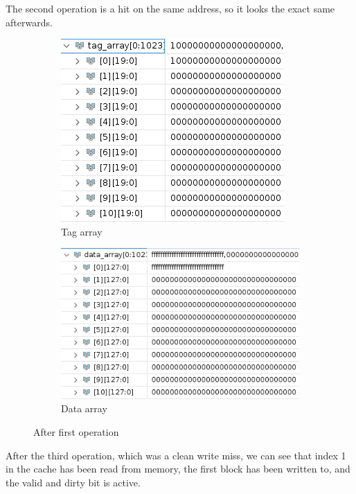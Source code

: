 \documentclass{article}
\begin{document}
The second operation is a hit on the same address, so it looks the exact same afterwards.
\begin{figure}[H]
\centering
\begin{subfigure}{.5\textwidth}
  \centering
  \includegraphics[width=.8\linewidth]{img/tag1.png}
  \caption{Tag array}
\end{subfigure}%
\begin{subfigure}{.5\textwidth}
  \centering
  \includegraphics[width=.9\linewidth]{img/data1.png}
  \caption{Data array}
\end{subfigure}
\caption{After first operation}
\end{figure}





After the third operation, which was a clean write miss, we can see that index 1 in the cache has been read from memory, the first block has been written to, and the valid and dirty bit is active.
\end{document}
